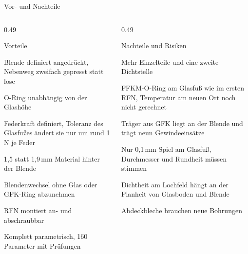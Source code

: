 \documentclass[10pt,aspectratio=169]{beamer}
\makeatletter
\let\jlu@olditemize\itemize
\let\jlu@oldenditemize\enditemize
\renewenvironment{itemize}
  {\jlu@olditemize\setlength{\itemsep}{1pt}\setlength{\parsep}{0pt}\setlength{\topsep}{2pt}}
  {\jlu@oldenditemize}
\newcommand{\pro}{\textcolor{giessenblau}{\textbf{+}}}
\newcommand{\con}{\textcolor{grauton}{\textbf{--}}}
\makeatother
\begin{document}
\begin{frame}{Vor- und Nachteile}
  \begin{columns}[T]
    \begin{column}{0.49\textwidth}
      \footnotesize
      \begin{block}{Vorteile}
        \begin{itemize}
          \item[\pro] Blende definiert angedrückt, Nebenweg zweifach gepresst statt lose
          \item[\pro] O-Ring unabhängig von der Glashöhe
          \item[\pro] Federkraft definiert, Toleranz des Glasfußes ändert sie nur um rund 1\,N je Feder
          \item[\pro] 1,5 statt 1,9\,mm Material hinter der Blende
          \item[\pro] Blendenwechsel ohne Glas oder GFK-Ring abzunehmen
          \item[\pro] RFN montiert an- und abschraubbar
          \item[\pro] Komplett parametrisch, 160 Parameter mit Prüfungen
        \end{itemize}
      \end{block}
    \end{column}
    \begin{column}{0.49\textwidth}
      \footnotesize
      \begin{alertblock}{Nachteile und Risiken}
        \begin{itemize}
          \item[\con] Mehr Einzelteile und eine zweite Dichtstelle
          \item[\con] FFKM-O-Ring am Glasfuß wie im ersten RFN, Temperatur am neuen Ort noch nicht gerechnet
          \item[\con] Träger aus GFK liegt an der Blende und trägt neun Gewindeeinsätze
          \item[\con] Nur 0,1\,mm Spiel am Glasfuß, Durchmesser und Rundheit müssen stimmen
          \item[\con] Dichtheit am Lochfeld hängt an der Planheit von Glasboden und Blende
          \item[\con] Abdeckbleche brauchen neue Bohrungen
        \end{itemize}
      \end{alertblock}
    \end{column}
  \end{columns}
\end{frame}
\end{document}
